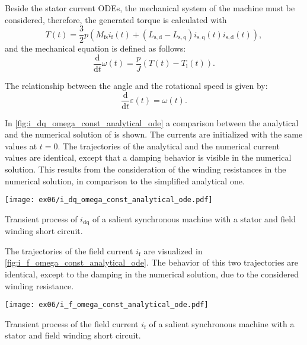 \begin{solutionblock}
    Beside the stator current ODEs, the mechanical system of the machine must be considered, therefore, the generated torque is calculated with
    \begin{equation}
        T(t) = \frac{3}{2}p\left(M_{\mathrm{fs}}i_{\mathrm{f}}(t) + \left(L_{\mathrm{s,d}}-L_{\mathrm{s,q}}\right)i_{\mathrm{s,q}}(t)i_{\mathrm{s,d}}(t)\right),
    \end{equation}
    and the mechanical equation is defined as follows:
    \begin{equation}
        \frac{\mathrm{d}}{\mathrm{d}t} \omega(t) = \frac{p}{J} \left(T(t)-T_{\mathrm{l}}(t)\right).
    \end{equation}

    The relationship between the angle and the rotational speed is given by:
    \begin{equation}
        \frac{\mathrm{d}}{\mathrm{d}t} \varepsilon(t) = \omega(t).
    \end{equation}

    In \autoref{fig:i_dq_omega_const_analytical_ode} a comparison between the analytical and the numerical solution of is shown. The currents are initialized with the same values at $t=0$. The trajectories of the analytical and the numerical current values are identical, except that a damping behavior is visible in the numerical solution. This results from the consideration of the winding resistances in the numerical solution, in comparison to the simplified analytical one.
    \begin{solutionfigure}[ht]
        \centering
        \texttt{[image: ex06/i\_dq\_omega\_const\_analytical\_ode.pdf]}
        \caption{Transient process of $i_{\mathrm{dq}}$ of a salient synchronous machine with a stator and field winding short circuit.}
        \label{fig:i_dq_omega_const_analytical_ode}
    \end{solutionfigure}

    The trajectories of the field current $i_{\mathrm{f}}$ are visualized in \autoref{fig:i_f_omega_const_analytical_ode}. The behavior of this two trajectories are identical, except to the damping in the numerical solution, due to the considered winding resistance.
    \begin{solutionfigure}[ht]
        \centering
        \texttt{[image: ex06/i\_f\_omega\_const\_analytical\_ode.pdf]}
        \caption{Transient process of the field current $i_{\mathrm{f}}$ of a salient synchronous machine with a stator and field winding short circuit.}
        \label{fig:i_f_omega_const_analytical_ode}
    \end{solutionfigure}

\end{solutionblock}

